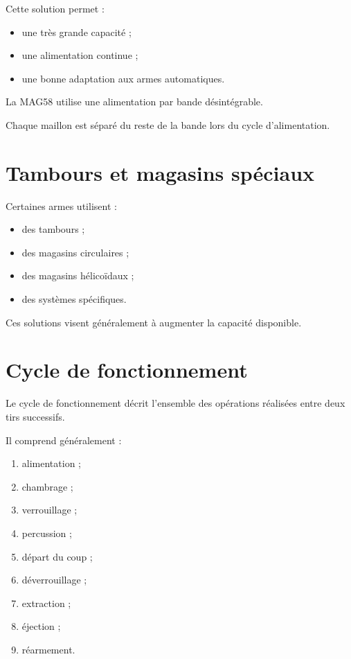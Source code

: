 Cette solution permet :

\begin{itemize}
    \item une très grande capacité ;
    \item une alimentation continue ;
    \item une bonne adaptation aux armes automatiques.
\end{itemize}

\begin{exemple}

La MAG58 utilise une alimentation par bande désintégrable.

Chaque maillon est séparé du reste de la bande lors du cycle
d'alimentation.

\end{exemple}

\section{Tambours et magasins spéciaux}

Certaines armes utilisent :

\begin{itemize}
    \item des tambours ;
    \item des magasins circulaires ;
    \item des magasins hélicoïdaux ;
    \item des systèmes spécifiques.
\end{itemize}

Ces solutions visent généralement à augmenter la capacité disponible.

\section{Cycle de fonctionnement}

Le cycle de fonctionnement décrit l'ensemble des opérations réalisées entre
deux tirs successifs.

Il comprend généralement :

\begin{enumerate}
    \item alimentation ;
    \item chambrage ;
    \item verrouillage ;
    \item percussion ;
    \item départ du coup ;
    \item déverrouillage ;
    \item extraction ;
    \item éjection ;
    \item réarmement.
\end{enumerate}

